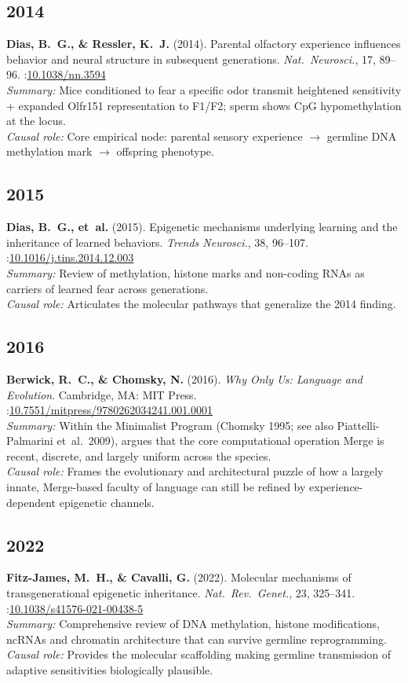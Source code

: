 \documentclass[11pt,a4paper]{article}
\begin{document}
\subsection*{2014}
\textbf{Dias, B.~G., \& Ressler, K.~J.} (2014). Parental olfactory experience influences behavior and neural structure in subsequent generations. \textit{Nat.\ Neurosci.}, 17, 89--96.  
\doi:\url{10.1038/nn.3594}\\
\textit{Summary:} Mice conditioned to fear a specific odor transmit heightened sensitivity + expanded Olfr151 representation to F1/F2; sperm shows CpG hypomethylation at the locus.\\
\textit{Causal role:} Core empirical node: parental sensory experience $\to$ germline DNA methylation mark $\to$ offspring phenotype.

\subsection*{2015}
\textbf{Dias, B.~G., et~al.} (2015). Epigenetic mechanisms underlying learning and the inheritance of learned behaviors. \textit{Trends Neurosci.}, 38, 96--107.  
\doi:\url{10.1016/j.tins.2014.12.003}\\
\textit{Summary:} Review of methylation, histone marks and non-coding RNAs as carriers of learned fear across generations.\\
\textit{Causal role:} Articulates the molecular pathways that generalize the 2014 finding.

\subsection*{2016}
\textbf{Berwick, R.~C., \& Chomsky, N.} (2016). \textit{Why Only Us: Language and Evolution}. Cambridge, MA: MIT Press.  
\doi:\url{10.7551/mitpress/9780262034241.001.0001}\\
\textit{Summary:} Within the Minimalist Program (Chomsky 1995; see also Piattelli-Palmarini et~al.\ 2009), argues that the core computational operation Merge is recent, discrete, and largely uniform across the species.\\
\textit{Causal role:} Frames the evolutionary and architectural puzzle of how a largely innate, Merge-based faculty of language can still be refined by experience-dependent epigenetic channels.

\subsection*{2022}
\textbf{Fitz-James, M.~H., \& Cavalli, G.} (2022). Molecular mechanisms of transgenerational epigenetic inheritance. \textit{Nat.\ Rev.\ Genet.}, 23, 325--341.  
\doi:\url{10.1038/s41576-021-00438-5}\\
\textit{Summary:} Comprehensive review of DNA methylation, histone modifications, ncRNAs and chromatin architecture that can survive germline reprogramming.\\
\textit{Causal role:} Provides the molecular scaffolding making germline transmission of adaptive sensitivities biologically plausible.
\end{document}
